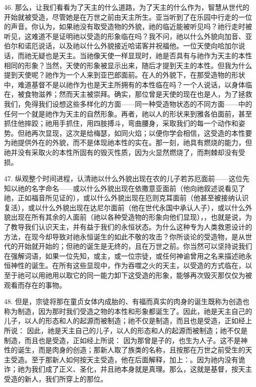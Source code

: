 46. 那么，让我们看看为了天主的什么道路，为了天主的什么作为，智慧从世代的开始就被受造，尽管她是在万世之前由天主所生。亚当听到了在乐园中行走的一位的声音。你认为，如果祂没有取受造物的外貌，祂的临近能被听见吗？祂行走时被听见，这难道不是证明祂以受造的形象临在吗？我不问，祂以什么外貌向加音、亚伯尔和诺厄说话，以及祂以什么外貌接近哈诺客并祝福他。一位天使向哈加尔说话，而祂无疑也是天主。当祂像天使一样显现时，祂是否具有与祂作为天主的本性相同的形象？当然，天使的形象被显示出来，随后才提到天主的本性。但我为什么提到天使呢？祂作为一个人来到亚巴郎面前。在人的外貌下，在那受造物的形状中，难道基督不是以祂作为也是天主所拥有的本性临在吗？一个人说话，以身体临在，被食物滋养；然而天主被崇拜。确实，那位曾是天使的现在也是人，为了拯救我们，免得我们设想这些多样化的方面——同一种受造物状态的不同方面——中的任何一个就是祂作为天主的自然形象。再者，祂以人的形状来到雅各伯面前，甚至抓住他摔跤；祂用手抓住，用四肢搏斗，弯曲腰身，采取我们的每一个动作和姿势。但祂再次显现，这次是给梅瑟，如同火焰；以便你学会相信，这受造的本性要为祂提供外在的外貌，而不是体现祂本性的实在。那一刻，祂具有燃烧的能力，但祂并没有采取火的本性所固有的毁灭性质，因为火显然燃烧了，而荆棘却没有受损。\par

47. 纵观整个时间进程，认清祂以什么外貌出现在农的儿子若苏厄面前——这位先知以祂的名字命名——或以什么外貌出现在依撒意亚面前（他向祂叙述说看见了祂，正如福音所见证的），或以什么外貌出现在厄则克耳面前（他甚至被接纳认识复活），或以什么外貌出现在达尼尔面前（他在世代永国中承认人子），或以什么外貌出现在所有其余的人面前（祂以各种受造物的形象向他们显现），，也就是说，为了教导我们认识天主，并有益于我们的永恒状态。为什么这种专为人类救恩设计的方法，在现今却导致对祂永恒诞生的如此不敬的攻击？你所谈论的受造物，是从世代的开始就开始的；但祂的诞生是无终的，且在万世之前。你当然可以坚持说我们在强解词语，如果一位先知，或主，或一位宗徒，或任何神谕曾用之名来描述祂永恒神性的诞生。在所有这些显现中，作为吞噬之火的天主，以受造的方式临在，以至于祂可以用祂用以取它的同一能力卸下这受造的形象，能够再次毁灭那仅仅为被观看而存在的事物。\par

48. 但是，宗徒将那在童贞女体内成胎的、有福而真实的肉身的诞生既称为创造也称为制造，因为那时我们受造之物的本性和形象都诞生了。因此，祂是天主自己的儿子，以人的形态和人的起源而被制造；祂不仅是制造，而且也是受造，正如经上所说： 因此，祂是天主自己的儿子，以人的形态和人的起源而被制造；祂不仅是制造，而且也是受造，正如经上所说： 因为那曾是子的，也生为人子。这不是神性的诞生，而是肉身的创造；那新人取了族类的名称，且按那在万世之前受生的天主受造。至于那新人如何按天主受造，他在后面解释，加上：。因为祂内没有诡诈；祂为我们成了正义、圣化，并且祂本身就是真理。那么，这就是基督，按天主受造的新人，我们所穿上的那位。\par

